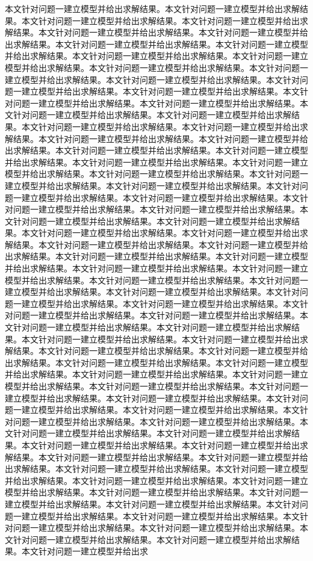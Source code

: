 本文针对问题一建立模型并给出求解结果。本文针对问题一建立模型并给出求解结果。本文针对问题一建立模型并给出求解结果。本文针对问题一建立模型并给出求解结果。本文针对问题一建立模型并给出求解结果。本文针对问题一建立模型并给出求解结果。本文针对问题一建立模型并给出求解结果。本文针对问题一建立模型并给出求解结果。本文针对问题一建立模型并给出求解结果。本文针对问题一建立模型并给出求解结果。本文针对问题一建立模型并给出求解结果。本文针对问题一建立模型并给出求解结果。本文针对问题一建立模型并给出求解结果。本文针对问题一建立模型并给出求解结果。本文针对问题一建立模型并给出求解结果。本文针对问题一建立模型并给出求解结果。本文针对问题一建立模型并给出求解结果。本文针对问题一建立模型并给出求解结果。本文针对问题一建立模型并给出求解结果。本文针对问题一建立模型并给出求解结果。本文针对问题一建立模型并给出求解结果。本文针对问题一建立模型并给出求解结果。本文针对问题一建立模型并给出求解结果。本文针对问题一建立模型并给出求解结果。本文针对问题一建立模型并给出求解结果。本文针对问题一建立模型并给出求解结果。本文针对问题一建立模型并给出求解结果。本文针对问题一建立模型并给出求解结果。本文针对问题一建立模型并给出求解结果。本文针对问题一建立模型并给出求解结果。本文针对问题一建立模型并给出求解结果。本文针对问题一建立模型并给出求解结果。本文针对问题一建立模型并给出求解结果。本文针对问题一建立模型并给出求解结果。本文针对问题一建立模型并给出求解结果。本文针对问题一建立模型并给出求解结果。本文针对问题一建立模型并给出求解结果。本文针对问题一建立模型并给出求解结果。本文针对问题一建立模型并给出求解结果。本文针对问题一建立模型并给出求解结果。本文针对问题一建立模型并给出求解结果。本文针对问题一建立模型并给出求解结果。本文针对问题一建立模型并给出求解结果。本文针对问题一建立模型并给出求解结果。本文针对问题一建立模型并给出求解结果。本文针对问题一建立模型并给出求解结果。本文针对问题一建立模型并给出求解结果。本文针对问题一建立模型并给出求解结果。本文针对问题一建立模型并给出求解结果。本文针对问题一建立模型并给出求解结果。本文针对问题一建立模型并给出求解结果。本文针对问题一建立模型并给出求解结果。本文针对问题一建立模型并给出求解结果。本文针对问题一建立模型并给出求解结果。本文针对问题一建立模型并给出求解结果。本文针对问题一建立模型并给出求解结果。本文针对问题一建立模型并给出求解结果。本文针对问题一建立模型并给出求解结果。本文针对问题一建立模型并给出求解结果。本文针对问题一建立模型并给出求解结果。本文针对问题一建立模型并给出求解结果。本文针对问题一建立模型并给出求解结果。本文针对问题一建立模型并给出求解结果。本文针对问题一建立模型并给出求解结果。本文针对问题一建立模型并给出求解结果。本文针对问题一建立模型并给出求解结果。本文针对问题一建立模型并给出求解结果。本文针对问题一建立模型并给出求解结果。本文针对问题一建立模型并给出求解结果。本文针对问题一建立模型并给出求解结果。本文针对问题一建立模型并给出求解结果。本文针对问题一建立模型并给出求解结果。本文针对问题一建立模型并给出求解结果。本文针对问题一建立模型并给出求解结果。本文针对问题一建立模型并给出求解结果。本文针对问题一建立模型并给出求解结果。本文针对问题一建立模型并给出求解结果。本文针对问题一建立模型并给出求解结果。本文针对问题一建立模型并给出求解结果。本文针对问题一建立模型并给出求解结果。本文针对问题一建立模型并给出求解结果。本文针对问题一建立模型并给出求解结果。本文针对问题一建立模型并给出求解结果。本文针对问题一建立模型并给出求解结果。本文针对问题一建立模型并给出求解结果。本文针对问题一建立模型并给出求解结果。本文针对问题一建立模型并给出求解结果。本文针对问题一建立模型并给出求